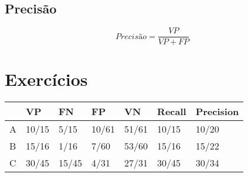 \documentclass[oneside]{article}            %
\begin{document}
\subsection{Precisão}

\begin{equation}
    Precisão = \frac{VP}{VP+FP}
\end{equation}


\newpage
\section{Exercícios}
\begin{table}[h!]
    \begin{tabular}{|l|l|l|l|l|l|l|}
    \hline
      & VP    & FN    & FP    & VN    & Recall & Precision \\ \hline
    A & 10/15 & 5/15  & 10/61 & 51/61 & 10/15  & 10/20     \\ \hline
    B & 15/16 & 1/16  & 7/60  & 53/60 & 15/16  & 15/22     \\ \hline
    C & 30/45 & 15/45 & 4/31  & 27/31 & 30/45  & 30/34     \\ \hline
    \end{tabular}
    \end{table}
\end{document}
